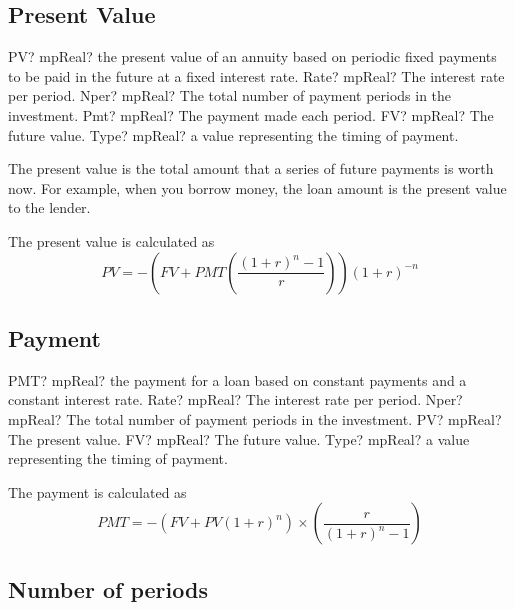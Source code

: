 \subsection{Present Value}

\begin{mpFunctionsExtract}
	\mpWorksheetFunctionFiveNotImplemented
	{PV? mpReal? the present value of an annuity based on periodic fixed payments to be paid in the future at a fixed interest rate.}
	{Rate? mpReal? The interest rate per period.}
	{Nper? mpReal? The total number of payment periods in the investment.}
	{Pmt? mpReal? The payment made each period.}
	{FV? mpReal? The future value.}
	{Type? mpReal? a value representing the timing of payment.}
\end{mpFunctionsExtract}

\vspace{0.3cm}
The present value is the total amount that a series of future payments is worth now. For example, when you borrow money, the loan amount is the present value to the lender.

The present value is calculated as
\begin{equation}
PV = - \left( FV+ PMT \left( \frac{(1+r)^n - 1}{r} \right) \right)   (1+r)^{-n} 
\end{equation}




\subsection{Payment}

\begin{mpFunctionsExtract}
	\mpWorksheetFunctionFiveNotImplemented
	{PMT? mpReal? the payment for a loan based on constant payments and a constant interest rate.}
	{Rate? mpReal? The interest rate per period.}
	{Nper? mpReal? The total number of payment periods in the investment.}
	{PV? mpReal? The present value.}
	{FV? mpReal? The future value.}
	{Type? mpReal? a value representing the timing of payment.}
\end{mpFunctionsExtract}

\vspace{0.3cm}
The payment is calculated as
\begin{equation}
PMT = - \left( FV + PV(1+r)^n \right) \times \left( \frac{r}{(1+r)^n - 1} \right)
\end{equation}




\subsection{Number of periods}

